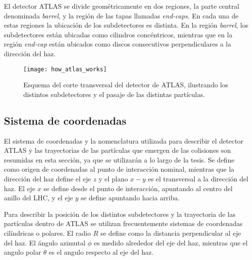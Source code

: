 El detector ATLAS se divide geométricamente en dos regiones, la parte central
denominada \emph{barrel}, y la región de las tapas llamadas \emph{end-caps}.
En cada una de estas regiones la ubicación de los
subdetectores es distinta. En la región \emph{barrel}, los subdetectores están
ubicadas como cilindros concéntricos, mientras que en la región \emph{end-cap}
están ubicados como discos consecutivos perpendiculares a la dirección del haz.


\begin{figure}[!htbp]
  \centering

  \texttt{[image: how\_atlas\_works]}

  \caption{Esquema del corte transversal del detector de ATLAS, ilustrando los distintos
  subdetectores y el pasaje de las distintas partículas.}
  \label{fig:how_atlas_works}

\end{figure}


\subsection{Sistema de coordenadas}


El sistema de coordenadas y la nomenclatura utilizada para describir el detector
ATLAS y las trayectorias de las partículas que emergen de las colisiones son
resumidas en esta sección, ya que se utilizarán a lo largo de la tesis. Se
define como origen de coordenadas al punto de interacción nominal, mientras que
la dirección del haz define el eje $z$ y el plano $x-y$ es el transversal a la
dirección del haz. El eje $x$ se define desde el punto de interacción, apuntando
al centro del anillo del LHC, y el eje $y$ se define apuntando hacia arriba.

Para describir la posición de los distintos
subdetectores y la trayectoria de las partículas dentro de ATLAS se utilizan
frecuentemente sistemas de coordenadas cilíndricas o polares. El radio $R$ se
define como la distancia perpendicular al eje del haz. El ángulo azimutal $\phi
$ es medido alrededor del eje del haz, mientras que el angulo polar $\theta$
es el angulo respecto al eje del haz.

